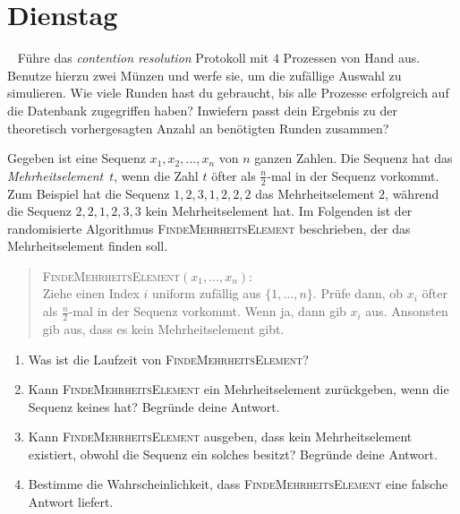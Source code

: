 \documentclass{uebung_cs}
\begin{document}
\section*{Dienstag}

\begin{exercise}\
	Führe das \textit{contention resolution} Protokoll mit $4$ Prozessen von Hand aus. Benutze hierzu zwei Münzen und werfe sie, um die zufällige Auswahl zu simulieren.
	Wie viele Runden hast du gebraucht, bis alle Prozesse erfolgreich auf die Datenbank zugegriffen haben?
	Inwiefern passt dein Ergebnis zu der theoretisch vorhergesagten Anzahl an benötigten Runden zusammen?
\end{exercise}    

\begin{exercise}[Mehrheit][\athome]
	Gegeben ist eine Sequenz $x_1,x_2,\dots,x_n$ von $n$ ganzen Zahlen. Die Sequenz hat das \textit{Mehrheitselement}~$t$, wenn die Zahl $t$ öfter als $\frac{n}{2}$-mal in der Sequenz vorkommt. Zum Beispiel hat die Sequenz $1,2,3,1,2,2,2$ das Mehrheitselement $2$, während die Sequenz $2,2,1,2,3,3$ kein Mehrheitselement hat. Im Folgenden ist der randomisierte Algorithmus \textsc{FindeMehrheitsElement} beschrieben, der das Mehrheitselement finden soll.
	
	\begin{quote}
		\textsc{FindeMehrheitsElement}$(x_1,\dots,x_n)$: \\
		Ziehe einen Index $i$ uniform zufällig aus $\{1,\dots,n\}$. Prüfe dann, ob $x_i$ öfter als $\frac{n}{2}$-mal in der Sequenz vorkommt. Wenn ja, dann gib $x_i$ aus. Ansonsten gib aus, dass es kein Mehrheitselement gibt.
	\end{quote}
	\begin{enumerate}
		\item\easy Was ist die Laufzeit von \textsc{FindeMehrheitsElement}?
		\item\easy Kann \textsc{FindeMehrheitsElement} ein Mehrheitselement zurückgeben, wenn die Sequenz keines hat? Begründe deine Antwort.
		\item\easy Kann \textsc{FindeMehrheitsElement} ausgeben, dass kein Mehrheitselement existiert, obwohl die Sequenz ein solches besitzt? Begründe deine Antwort.
		\item\medium Bestimme die Wahrscheinlichkeit, dass \textsc{FindeMehrheitsElement} eine falsche Antwort liefert.
	\end{enumerate}
\end{exercise}
\end{document}
